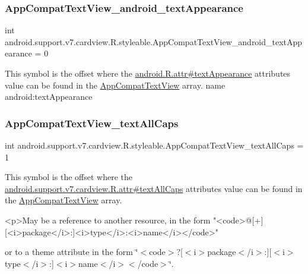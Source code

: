 \subsubsection{\texorpdfstring{App\+Compat\+Text\+View\+\_\+android\+\_\+text\+Appearance}{AppCompatTextView\_android\_textAppearance}}
{\footnotesize\ttfamily int android.\+support.\+v7.\+cardview.\+R.\+styleable.\+App\+Compat\+Text\+View\+\_\+android\+\_\+text\+Appearance = 0\hspace{0.3cm}{\ttfamily [static]}}

This symbol is the offset where the \hyperlink{}{android.\+R.\+attr\#text\+Appearance} attribute\textquotesingle{}s value can be found in the \hyperlink{classandroid_1_1support_1_1v7_1_1cardview_1_1R_1_1styleable_af61bc97363f0e3c84c9e3784694f0888}{App\+Compat\+Text\+View} array.  name android\+:text\+Appearance \mbox{\label{classandroid_1_1support_1_1v7_1_1cardview_1_1R_1_1styleable_a933d95eb55173c60b189dd6ed21b2d3a}} 
\subsubsection{\texorpdfstring{App\+Compat\+Text\+View\+\_\+text\+All\+Caps}{AppCompatTextView\_textAllCaps}}
{\footnotesize\ttfamily int android.\+support.\+v7.\+cardview.\+R.\+styleable.\+App\+Compat\+Text\+View\+\_\+text\+All\+Caps = 1\hspace{0.3cm}{\ttfamily [static]}}

This symbol is the offset where the \hyperlink{classandroid_1_1support_1_1v7_1_1cardview_1_1R_1_1attr_a319eca13d313e050d22fac372aa21425}{android.\+support.\+v7.\+cardview.\+R.\+attr\#text\+All\+Caps} attribute\textquotesingle{}s value can be found in the \hyperlink{classandroid_1_1support_1_1v7_1_1cardview_1_1R_1_1styleable_af61bc97363f0e3c84c9e3784694f0888}{App\+Compat\+Text\+View} array.

\begin{DoxyVerb}      <p>May be a reference to another resource, in the form "<code>@[+][<i>package</i>:]<i>type</i>:<i>name</i></code>"
\end{DoxyVerb}
 or to a theme attribute in the form \char`\"{}$<$code$>$?\mbox{[}$<$i$>$package$<$/i$>$\+:\mbox{]}\mbox{[}$<$i$>$type$<$/i$>$\+:\mbox{]}$<$i$>$name$<$/i$>$$<$/code$>$\char`\"{}. 

